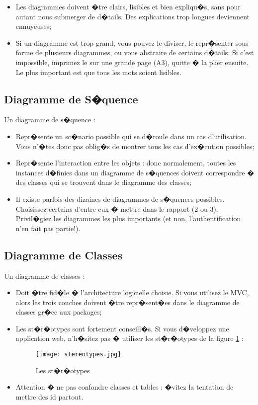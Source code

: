 \begin{spacing}{1.2}
\begin{itemize}
\item Les diagrammes doivent �tre clairs, lisibles et bien expliqu�s, sans pour autant
nous submerger de d�tails. Des explications trop longues deviennent ennuyeuses;
\item Si un diagramme est trop grand, vous pouvez le diviser, le repr�senter sous
forme de plusieurs diagrammes, ou vous abstraire de certains d�tails. Si c'est
impossible, imprimez le sur une grande page (A3), quitte � la plier ensuite. Le
plus important est que tous les mots soient lisibles.

\end{itemize}
\subsection{Diagramme de S�quence}
Un diagramme de s�quence :
\begin{itemize}
	\item Repr�sente un sc�nario possible qui se d�roule dans un cas d'utilisation. 
	Vous n'�tes donc pas oblig�s de montrer tous les cas d'ex�cution possibles;
	\item Repr�sente l'interaction entre les objets : donc normalement, toutes les
	instances d�finies dans un diagramme de s�quences doivent correspondre 
	 � des classes qui se trouvent dans le diagramme des classes;
	 \item Il existe parfois des dizaines de diagrammes de s�quences possibles. Choisissez certains d'entre eux � mettre dans le rapport (2 ou 3). Privil�giez les diagrammes les plus importants (et non, l'authentification n'en fait pas partie!).
\end{itemize}
\subsection{Diagramme de Classes}
Un diagramme de classes :
\begin{itemize}
\item Doit �tre fid�le � l'architecture logicielle choisie. Si vous utilisez le MVC, 
alors les trois couches doivent �tre repr�sent�es dans le diagramme de classes gr�ce aux packages;
\item Les st�r�otypes sont fortement conseill�s. Si vous d�veloppez une
application web, n'h�sitez pas � utiliser les st�r�otypes de la figure \ref{fig:fig2} : 
\begin{figure}[!ht]\centering
\texttt{[image: stereotypes.jpg]}
\caption{Les st�r�otypes}
\label{fig:fig2}
\end{figure}
\item Attention � ne pas confondre classes et tables : �vitez la tentation de
mettre des id partout.


\end{itemize}
\end{spacing}
